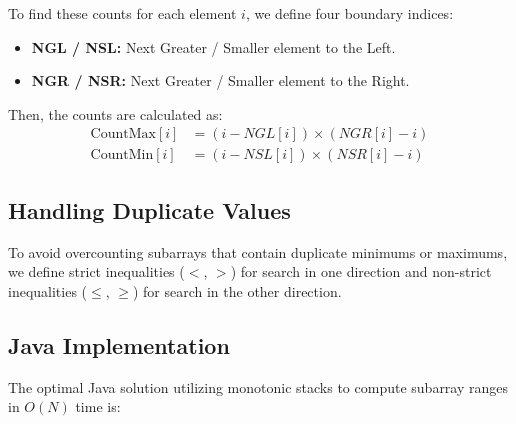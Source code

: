 \documentclass[10pt,journal,compsoc,onecolumn]{IEEEtran}
\begin{document}
To find these counts for each element $i$, we define four boundary indices:
\begin{itemize}
    \item \textbf{NGL / NSL:} Next Greater / Smaller element to the Left.
    \item \textbf{NGR / NSR:} Next Greater / Smaller element to the Right.
\end{itemize}
Then, the counts are calculated as:
\begin{align}
\text{CountMax}[i] &= (i - NGL[i]) \times (NGR[i] - i) \\
\text{CountMin}[i] &= (i - NSL[i]) \times (NSR[i] - i)
\end{align}

\subsection{Handling Duplicate Values}
To avoid overcounting subarrays that contain duplicate minimums or maximums, we define strict inequalities ($<$, $>$) for search in one direction and non-strict inequalities ($\le$, $\ge$) for search in the other direction.

\subsection{Java Implementation}
The optimal Java solution utilizing monotonic stacks to compute subarray ranges in $O(N)$ time is:
\end{document}
